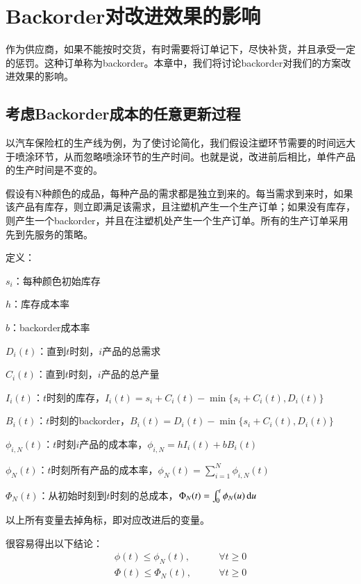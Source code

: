 
\chapter{Backorder对改进效果的影响}

作为供应商，如果不能按时交货，有时需要将订单记下，尽快补货，并且承受一定的惩罚。这种订单称为backorder。本章中，我们将讨论backorder对我们的方案改进效果的影响。




\section{考虑Backorder成本的任意更新过程}

以汽车保险杠的生产线为例，为了使讨论简化，我们假设注塑环节需要的时间远大于喷涂环节，从而忽略喷涂环节的生产时间。也就是说，改进前后相比，单件产品的生产时间是不变的。

假设有N种颜色的成品，每种产品的需求都是独立到来的。每当需求到来时，如果该产品有库存，则立即满足该需求，且注塑机产生一个生产订单；如果没有库存，则产生一个backorder，并且在注塑机处产生一个生产订单。所有的生产订单采用先到先服务的策略。

定义：

$s_i$：每种颜色初始库存

$h$：库存成本率

$b$：backorder成本率

$D_i(t)$：直到$t$时刻，$i$产品的总需求

$C_i(t)$：直到$t$时刻，$i$产品的总产量

$I_i(t)$：$t$时刻的库存，$I_i(t)=s_i+C_i(t)-\min\{s_i+C_i(t),D_i(t)\}$

$B_i(t)$：$t$时刻的backorder，$B_i(t)=D_i(t)-\min\{s_i+C_i(t),D_i(t)\}$

$\phi_{i,N}(t)$：$t$时刻$i$产品的成本率，$\phi_{i,N}=hI_i(t)+bB_i(t)$

$\phi_N(t)$：$t$时刻所有产品的成本率，$\phi_N(t)=\sum_{i=1}^N\phi_{i,N}(t)$

$\Phi_N(t)$：从初始时刻到$t$时刻的总成本，$\Phi_N(t)=\int_0^t\phi_N(u)\operatorname{d\!} u$

以上所有变量去掉角标，即对应改进后的变量。

很容易得出以下结论：
\begin{align}
\phi(t) \leq \phi_N(t),& \qquad \forall t\geq 0 \\
\Phi(t) \leq \Phi_N(t),& \qquad \forall t\geq 0
\end{align}

